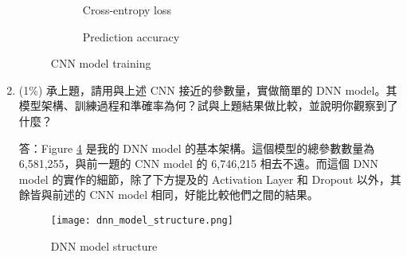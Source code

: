 \documentclass[12pt,a4paper]{extarticle}
\begin{document}
\begin{enumerate}
  \begin{figure}[ht]
    \begin{subfigure}[t]{0.5\textwidth}
    \caption{Cross-entropy loss}
    \label{fig:cnn-epoch-loss}
    \end{subfigure}
    \begin{subfigure}[t]{0.5\textwidth}
      \caption{Prediction accuracy}
      \label{fig:cnn-epoch-acc}
    \end{subfigure}
    \caption{CNN model training}
    \label{fig:cnn-training}
  \end{figure}

  \newpage

	\item (1\%) 承上題，請用與上述 CNN 接近的參數量，實做簡單的 DNN model。其模型架構、訓練過程和準確率為何？試與上題結果做比較，並說明你觀察到了什麼？
  \par 答：Figure \ref{fig:dnn-model-structure} 是我的 DNN model 的基本架構。這個模型的總參數數量為 6,581,255，與前一題的 CNN model 的 6,746,215 相去不遠。而這個 DNN model 的實作的細節，除了下方提及的 Activation Layer 和 Dropout 以外，其餘皆與前述的 CNN model 相同，好能比較他們之間的結果。

  \begin{figure}[ht]
    \centering
    \texttt{[image: dnn\_model\_structure.png]}
    \caption{DNN model structure}
    \label{fig:dnn-model-structure}
  \end{figure}


\end{enumerate}
\end{document}
